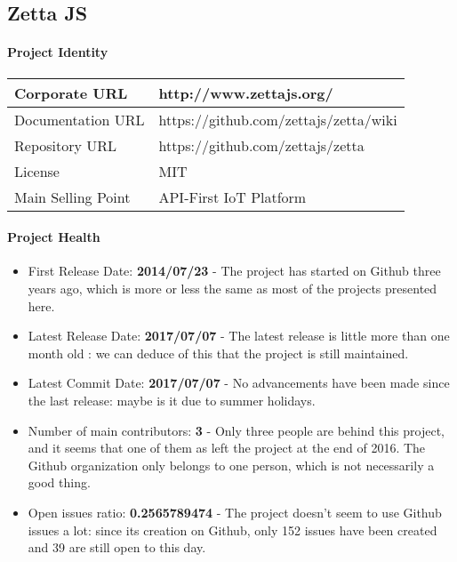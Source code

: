 \documentclass{article}
\begin{document}
\subsection{Zetta JS}

\paragraph{Project Identity}

\begin{center}
\begin{tabular}{|l|l|}
\hline
Corporate URL & http://www.zettajs.org/ \\ \hline
Documentation URL & https://github.com/zettajs/zetta/wiki \\ \hline
Repository URL & https://github.com/zettajs/zetta \\ \hline
License & MIT \\ \hline
Main Selling Point & API-First IoT Platform \\ \hline
\end{tabular}
\end{center}

\paragraph{Project Health}

\begin{itemize}
\item First Release Date: \textbf{2014/07/23} - The project has started on Github three years ago, which is more or less the same as most of the projects presented here.
\item Latest Release Date: \textbf{2017/07/07} - The latest release is little more than one month old : we can deduce of this that the project is still maintained.
\item Latest Commit Date: \textbf{2017/07/07} - No advancements have been made since the last release: maybe is it due to summer holidays.
\item Number of main contributors: \textbf{3} - Only three people are behind this project, and it seems that one of them as left the project at the end of 2016. The Github organization only belongs to one person, which is not necessarily a good thing.
\item Open issues ratio: \textbf{0.2565789474} - The project doesn't seem to use Github issues a lot: since its creation on Github, only 152 issues have been created and 39 are still open to this day.
\end{itemize}
\end{document}
